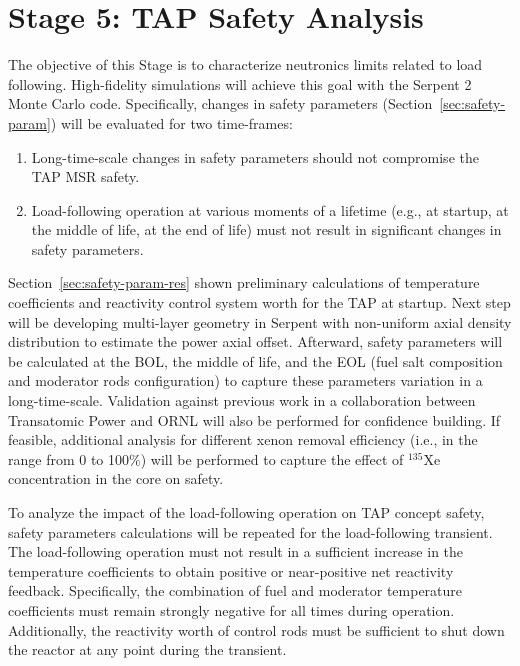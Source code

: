 \section{Stage 5: \gls{TAP} Safety Analysis}
The objective of this Stage is to characterize neutronics limits related to 
load following. High-fidelity simulations will achieve this goal with the 
Serpent 2 Monte Carlo code. Specifically, changes in safety parameters 
(Section~\ref{sec:safety-param}) will be evaluated for two time-frames:
\begin{enumerate}
	\item Long-time-scale changes in safety parameters should not compromise 
	the \gls{TAP} \gls{MSR} safety.
	\item Load-following operation at various moments of a lifetime (e.g., at
	startup, at the middle of life, at the end of life) must not result in 
	significant changes in safety parameters.
\end{enumerate}
Section~\ref{sec:safety-param-res} shown preliminary calculations of  
temperature coefficients and reactivity control system worth for the \gls{TAP} 
at startup. Next step will be developing multi-layer geometry in Serpent with 
non-uniform axial density distribution to estimate the power axial offset. 
Afterward, safety parameters will be calculated at the \gls{BOL}, the middle 
of life, and the \gls{EOL} (fuel salt composition and moderator rods 
configuration) to capture these parameters variation in a long-time-scale. 
Validation against previous work in a collaboration between Transatomic Power 
and ORNL \cite{betzler_assessment_2017, betzler_fuel_2018} will also be 
performed for confidence building. If feasible, additional analysis for 
different xenon removal efficiency (i.e., in the range from 0 to 100\%) will 
be performed to capture the effect of $^{135}$Xe concentration in the core on 
safety.

To analyze the impact of the load-following operation on \gls{TAP} concept 
safety, safety parameters calculations will be repeated for the load-following 
transient. The load-following operation must not result in a sufficient 
increase in the temperature coefficients to obtain positive or near-positive 
net reactivity feedback. Specifically, the combination of fuel and moderator 
temperature coefficients must remain strongly negative for all times during 
operation. Additionally, the reactivity worth of control rods must be  
sufficient to shut down the reactor at any point during the transient.


